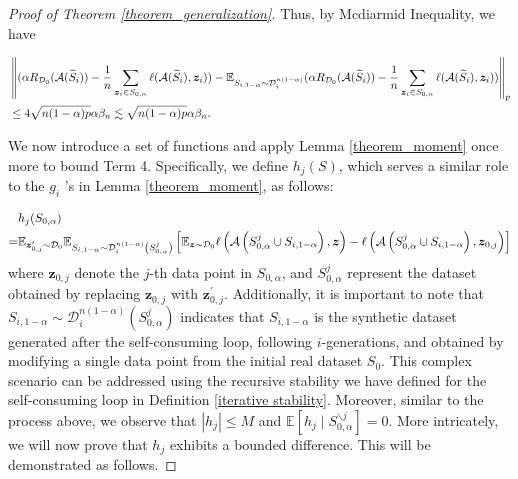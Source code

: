 \begin{proof}[Proof of Theorem \ref{theorem_generalization}]
Thus, by Mcdiarmid Inequality, we have

\begin{align}
&\left\|(\alpha R_{\mathcal{D}_0}(\mathcal{A}(\widetilde{S}_i))-\frac{1}{n}\sum_{\boldsymbol{z}_{i}\in S_{0,\alpha}}\ell(\mathcal{A}(\widetilde{S}_i),\boldsymbol{z}_{i}))-\mathbb{E}_{S_{i,1-\alpha} \sim \mathcal{D}_i^{n(1-\alpha)}} (\alpha R_{\mathcal{D}_0}(\mathcal{A}(\widetilde{S}_i))-\frac{1}{n}\sum_{\boldsymbol{z}_{i}\in S_{0,\alpha}}\ell(\mathcal{A}(\widetilde{S}_i),\boldsymbol{z}_{i}))\right\|_p \notag \\
&\leq 4 \sqrt{n(1-\alpha) p} \alpha \beta_{n} \lesssim \sqrt{n(1-\alpha) p} \alpha \beta_{n}. \label{proof1-delta1}
\end{align}

We now introduce a set of functions and apply Lemma \ref{theorem_moment} once more to bound Term 4. Specifically, we define $h_j(S)$, which serves a similar role to the $g_i$ 's in Lemma \ref{theorem_moment}, as follows:

\begin{align}
&h_j(S_{0,\alpha})\notag \\
=&\mathbb{E}_{\boldsymbol{z}_{0,j}^{\prime} \sim \mathcal{D}_0} \mathbb{E}_{S_{i,1-\alpha} \sim \mathcal{D}_i^{n(1-\alpha)}\left(S_{0,\alpha}^j\right)}\left[\mathbb{E}_{\boldsymbol{z} \sim \mathcal{D}_0} \ell\left(\mathcal{A}\left(S_{0,\alpha}^j \cup S_{i,1-\alpha}\right), \boldsymbol{z}\right)-\ell\left(\mathcal{A}\left(S_{0,\alpha}^j \cup S_{i,1-\alpha}\right), \boldsymbol{z}_{0,j}\right)\right]
\end{align}
where $\boldsymbol{z}_{0, j}$ denote the $j$-th data point in $S_{0, \alpha}$, and $S_{0, \alpha}^j$ represent the dataset obtained by replacing $\boldsymbol{z}_{0, j}$ with $\boldsymbol{z}_{0, j}^{\prime}$. Additionally, it is important to note that $S_{i, 1-\alpha} \sim \mathcal{D}_i^{n(1-\alpha)}\left(S_{0, \alpha}^j\right)$ indicates that $S_{i, 1-\alpha}$ is the synthetic dataset generated after the self-consuming loop, following $i$-generations, and obtained by modifying a single data point from the initial real dataset $S_0$. This complex scenario can be addressed using the recursive stability we have defined for the self-consuming loop in Definition \ref{iterative stability}. Moreover, similar to the process above, we observe that $\left|h_j\right| \leq M$ and $\mathbb{E}\left[h_j \mid S_{0, \alpha}^{\backslash j}\right]=0$. More intricately, we will now prove that $h_j$ exhibits a bounded difference. This will be demonstrated as follows.


\end{proof}
